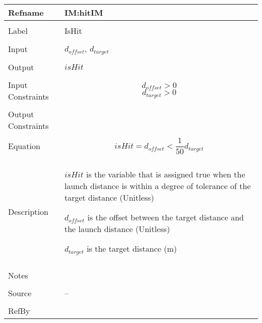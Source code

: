 \documentclass[12pt]{article}
\begin{document}
\noindent \begin{minipage}{\textwidth}
\begin{tabular}{p{} p{}}
\toprule \textbf{Refname} & \textbf{IM:hitIM}
\label{IM:hitIM}
\\ \midrule \\
Label & IsHit
\\ \midrule \\
Input & ${d_{offset}}$, ${d_{target}}$
\\ \midrule \\
Output & $isHit$
\\ \midrule \\
Input Constraints & \begin{displaymath}
                    {d_{offset}}>0
                    \end{displaymath}
                    \begin{displaymath}
                    {d_{target}}>0
                    \end{displaymath}
\\ \midrule \\
Output Constraints & 
\\ \midrule \\
Equation & \begin{displaymath}
           isHit={d_{offset}}<\frac{1}{50} {d_{target}}
           \end{displaymath}
\\ \midrule \\
Description & \begin{symbDescription}
              \item{$isHit$ is the variable that is assigned true when the launch distance is within a degree of tolerance of the target distance (Unitless)}
              \item{${d_{offset}}$ is the offset between the target distance and the launch distance (Unitless)}
              \item{${d_{target}}$ is the target distance (m)}
              \end{symbDescription}
\\ \midrule \\
Notes & 
\\ \midrule \\
Source & --
\\ \midrule \\
RefBy & 
\\ \bottomrule \end{tabular}
\end{minipage}
\end{document}
